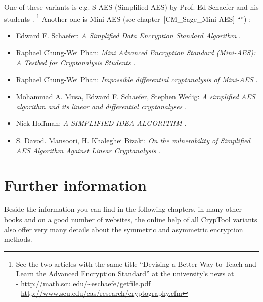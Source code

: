 One of these variants is e.g. S-AES (Simplified-AES) by Prof. Ed Schaefer
and his students \cite{cm:Musa-etal2003}.%
\footnote{
    See the two articles with the same title
    ``Devising a Better Way to Teach and Learn the Advanced Encryption Standard''
    at the university's news at\\
    - \url{http://math.scu.edu/~eschaefe/getfile.pdf} \\
    - \url{http://www.scu.edu/cas/research/cryptography.cfm}
}
Another one is Mini-AES \cite{cm:Phan2002}
(see chapter~\ref{CM_Sage_Mini-AES} ``'')%
:
\begin{itemize}

\item Edward F. Schaefer: {\em A Simplified Data Encryption Standard Algorithm} 
      \cite{cm:Schaefer1996}.

\item Raphael Chung-Wei Phan: {\em Mini Advanced Encryption Standard (Mini-AES):
                                   A Testbed for Cryptanalysis Students} 
      \cite{cm:Phan2002}.

\item Raphael Chung-Wei Phan: {\em Impossible differential cryptanalysis of Mini-AES} 
      \cite{cm:Phan2003}.

\item Mohammad A. Musa, Edward F. Schaefer, Stephen Wedig:
      {\em A simplified AES algorithm and its linear and differential cryptanalyses} 
      \cite{cm:Musa-etal2003}.

\item Nick Hoffman: {\em A SIMPLIFIED IDEA ALGORITHM} 
      \cite{cm:Hoffman2006}.

\item S. Davod. Mansoori, H. Khaleghei Bizaki: 
      {\em On the vulnerability of Simplified AES Algorithm Against Linear Cryptanalysis} 
      \cite{cm:Mansoori-etal2007}.

\end{itemize}




\section{Further information}

Beside the information you can find in the following chapters, in many other
books and on a good number of websites, the online help of all
CrypTool variants also offer very many details about the 
symmetric and asymmetric encryption methods.


